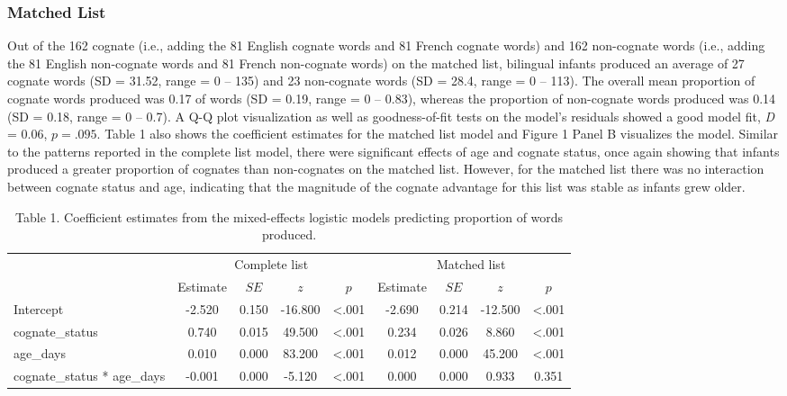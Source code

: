 \documentclass[
  ,man,floatsintext]{apa6}
\begin{document}
\hypertarget{matched-list}{%
\subsubsection{Matched List}\label{matched-list}}

Out of the 162 cognate (i.e., adding the 81 English cognate words and 81 French cognate words) and 162 non-cognate words (i.e., adding the 81 English non-cognate words and 81 French non-cognate words) on the matched list, bilingual infants produced an average of 27 cognate words (SD = 31.52, range = 0 -- 135) and 23 non-cognate words (SD = 28.4, range = 0 -- 113). The overall mean proportion of cognate words produced was 0.17 of words (SD = 0.19, range = 0 -- 0.83), whereas the proportion of non-cognate words produced was 0.14 (SD = 0.18, range = 0 -- 0.7). A Q-Q plot visualization as well as goodness-of-fit tests on the model's residuals showed a good model fit, \emph{D} = 0.06, \(p = .095\). Table 1 also shows the coefficient estimates for the matched list model and Figure 1 Panel B visualizes the model. Similar to the patterns reported in the complete list model, there were significant effects of age and cognate status, once again showing that infants produced a greater proportion of cognates than non-cognates on the matched list. However, for the matched list there was no interaction between cognate status and age, indicating that the magnitude of the cognate advantage for this list was stable as infants grew older.

\begin{table}[H]

\begin{center}
\begin{threeparttable}

\caption{\label{tab:Table 1}Table 1. Coefficient estimates from the mixed-effects logistic models predicting proportion of words produced.}

\begin{tabular}{lcccccccc}
\toprule
 & \multicolumn{4}{c}{Complete list} & \multicolumn{4}{c}{Matched list} \\
\cmidrule(r){2-5} \cmidrule(r){6-9}
 & Estimate & $SE$ & $z$ & $p$ & Estimate & $SE$ & $z$ & $p$\\
\midrule
Intercept & -2.520 & 0.150 & -16.800 & <.001 & -2.690 & 0.214 & -12.500 & <.001\\
cognate\_status & 0.740 & 0.015 & 49.500 & <.001 & 0.234 & 0.026 & 8.860 & <.001\\
age\_days & 0.010 & 0.000 & 83.200 & <.001 & 0.012 & 0.000 & 45.200 & <.001\\
cognate\_status * age\_days & -0.001 & 0.000 & -5.120 & <.001 & 0.000 & 0.000 & 0.933 & 0.351\\
\bottomrule
\end{tabular}

\end{threeparttable}
\end{center}

\end{table}
\end{document}
